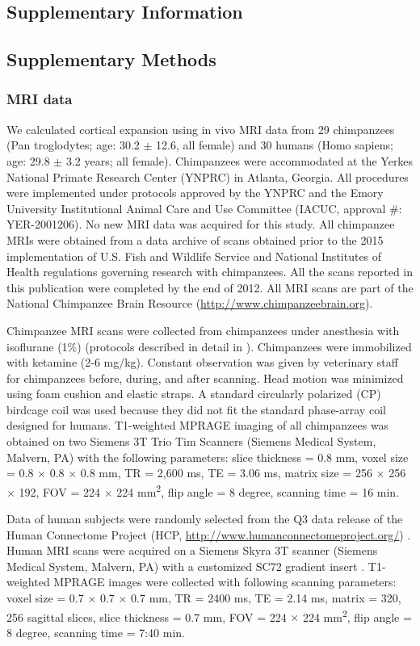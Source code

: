 \begin{refsection}
\newpage
\section*{Supplementary Information}
\subsection*{Supplementary Methods}
\subsubsection*{MRI data}
We calculated cortical expansion using in vivo MRI data from 29 chimpanzees (Pan troglodytes; age: 30.2 $\pm$ 12.6, all female) and 30 humans (Homo sapiens; age: 29.8 $\pm$ 3.2 years; all female). Chimpanzees were accommodated at the Yerkes National Primate Research Center (YNPRC) in Atlanta, Georgia. All procedures were implemented under protocols approved by the YNPRC and the Emory University Institutional Animal Care and Use Committee (IACUC, approval \#: YER-2001206). No new MRI data was acquired for this study. All chimpanzee MRIs were obtained from a data archive of scans obtained prior to the 2015 implementation of U.S. Fish and Wildlife Service and National Institutes of Health regulations governing research with chimpanzees. All the scans reported in this publication were completed by the end of 2012. All MRI scans are part of the National Chimpanzee Brain Resource (\url{http://www.chimpanzeebrain.org}).

Chimpanzee MRI scans were collected from chimpanzees under anesthesia with isoflurane (1\%) (protocols described in detail in \citep{Li2013MappingPH}). Chimpanzees were immobilized with ketamine (2-6 mg/kg). Constant observation was given by veterinary staff for chimpanzees before, during, and after scanning. Head motion was minimized using foam cushion and elastic straps. A standard circularly polarized (CP) birdcage coil was used because they did not fit the standard phase-array coil designed for humans. T1-weighted MPRAGE imaging of all chimpanzees was obtained on two Siemens 3T Trio Tim Scanners (Siemens Medical System, Malvern, PA) with the following parameters: slice thickness = 0.8 mm, voxel size = 0.8 $\times$ 0.8 $\times$ 0.8 mm, TR = 2,600 ms, TE = 3.06 ms, matrix size = 256 $\times$ 256 $\times$ 192, FOV = 224 $\times$ 224 mm\textsuperscript{2}, flip angle = 8 degree, scanning time = 16 min.

Data of human subjects were randomly selected from the Q3 data release of the Human Connectome Project (HCP, \url{http://www.humanconnectomeproject.org/}) \citep{VANESSEN201362}. Human MRI scans were acquired on a Siemens Skyra 3T scanner (Siemens Medical System, Malvern, PA) with a customized SC72 gradient insert \citep{VANESSEN201362}. T1-weighted MPRAGE images were collected with following scanning parameters: voxel size = 0.7 $\times$ 0.7 $\times$ 0.7 mm, TR = 2400 ms, TE = 2.14 ms, matrix = 320, 256 sagittal slices, slice thickness = 0.7 mm, FOV = 224 $\times$ 224 mm\textsuperscript{2}, flip angle = 8 degree, scanning time = 7:40 min.


\end{refsection}
